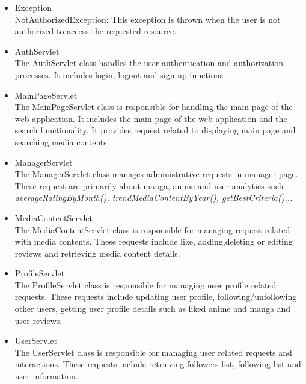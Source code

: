 \begin{itemize}
    \item Exception \\
    NotAuthorizedException: This exception is thrown when the user is not authorized to access the requested resource.
    \item AuthServlet \\
    The AuthServlet class handles the user authentication and authorization processes. It includes login, logout and sign up functions
    \item MainPageServlet \\
    The MainPageServlet class is responsible for handling the main page of the web application. It includes the main page of the web application and the search functionality.
    It provides request related to displaying main page and searching media contents.
    \item ManagerServlet \\
    The ManagerServlet class manages administrative requests in manager page. These request are primarily about manga, anime and user analytics such \textit{averageRatingByMonth(), trendMediaContentByYear(), getBestCriteria()...}
    \item MediaContentServlet \\
    The MediaContentServlet class is responsible for managing request related with media contents. These requests include like, adding,deleting or editing reviews and retrieving media content details. 
    \item ProfileServlet \\
    The ProfileServlet class is responsible for managing user profile related requests. These requests include updating user profile, following/unfollowing other users, getting user profile details such as liked anime and manga and user reviews.
    \item UserServlet \\
    The UserServlet class is responsible for managing user related requests and interactions. These requests include retrieving followers list, following list and user information. 
\end{itemize}

